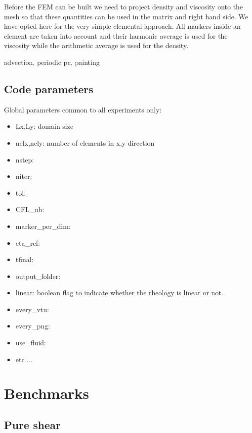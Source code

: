 \documentclass[a4paper]{article}
\newcommand{\python}{\color{darkgray} \sffamily }
\begin{document}
Before the FEM can be built we need to project density and viscosity onto the 
mesh so that these quantities can be used in the matrix and right hand side.
We have opted here for the very simple elemental approach. All markers inside
an element are taken into account and their harmonic average is used for the 
viscosity while the arithmetic average is used for the density.
 

 advection, periodic pc, painting




\subsection{Code parameters}

Global parameters common to all experiments only:
\begin{itemize}
\item {\python Lx,Ly}: domain size
\item {\python nelx,nely}: number of elements in x,y direction 
\item {\python nstep}:
\item {\python niter}:
\item {\python tol}:
\item {\python CFL\_nb}:
\item {\python marker\_per\_dim}:
\item {\python eta\_ref}:
\item {\python tfinal}:
\item {\python output\_folder}:
\item {\python linear}: boolean flag to indicate whether the rheology is linear or not.
\item {\python every\_vtu}:
\item {\python every\_png}:
\item {\python use\_fluid}:
\item etc ...
\end{itemize}



\newpage
\section{Benchmarks}

\subsection{Pure shear}
\end{document}
